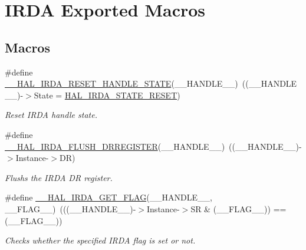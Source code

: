 \hypertarget{group___i_r_d_a___exported___macros}{}\section{I\+R\+DA Exported Macros}
\label{group___i_r_d_a___exported___macros}
\subsection*{Macros}
\begin{DoxyCompactItemize}
\item 
\#define \hyperlink{group___i_r_d_a___exported___macros_ga3cdb66f911dce4c8544139adbb314faa}{\+\_\+\+\_\+\+H\+A\+L\+\_\+\+I\+R\+D\+A\+\_\+\+R\+E\+S\+E\+T\+\_\+\+H\+A\+N\+D\+L\+E\+\_\+\+S\+T\+A\+TE}(\+\_\+\+\_\+\+H\+A\+N\+D\+L\+E\+\_\+\+\_\+)~((\+\_\+\+\_\+\+H\+A\+N\+D\+L\+E\+\_\+\+\_\+)-\/$>$State = \hyperlink{group___i_r_d_a___exported___types_ggab3e65b75c9d4ae39bc50a31222509e1eaa004e82e1ca1d36b3dc84cf9441954dd}{H\+A\+L\+\_\+\+I\+R\+D\+A\+\_\+\+S\+T\+A\+T\+E\+\_\+\+R\+E\+S\+ET})
\begin{DoxyCompactList}\small\item\em Reset I\+R\+DA handle state. \end{DoxyCompactList}\item 
\#define \hyperlink{group___i_r_d_a___exported___macros_ga0c097de13209ede853a30d511cf5a00e}{\+\_\+\+\_\+\+H\+A\+L\+\_\+\+I\+R\+D\+A\+\_\+\+F\+L\+U\+S\+H\+\_\+\+D\+R\+R\+E\+G\+I\+S\+T\+ER}(\+\_\+\+\_\+\+H\+A\+N\+D\+L\+E\+\_\+\+\_\+)~((\+\_\+\+\_\+\+H\+A\+N\+D\+L\+E\+\_\+\+\_\+)-\/$>$Instance-\/$>$DR)
\begin{DoxyCompactList}\small\item\em Flushs the I\+R\+DA DR register. \end{DoxyCompactList}\item 
\#define \hyperlink{group___i_r_d_a___exported___macros_ga032a53fbbc65bfd0fff2b4a26c52e790}{\+\_\+\+\_\+\+H\+A\+L\+\_\+\+I\+R\+D\+A\+\_\+\+G\+E\+T\+\_\+\+F\+L\+AG}(\+\_\+\+\_\+\+H\+A\+N\+D\+L\+E\+\_\+\+\_\+,  \+\_\+\+\_\+\+F\+L\+A\+G\+\_\+\+\_\+)~(((\+\_\+\+\_\+\+H\+A\+N\+D\+L\+E\+\_\+\+\_\+)-\/$>$Instance-\/$>$SR \& (\+\_\+\+\_\+\+F\+L\+A\+G\+\_\+\+\_\+)) == (\+\_\+\+\_\+\+F\+L\+A\+G\+\_\+\+\_\+))
\begin{DoxyCompactList}\small\item\em Checks whether the specified I\+R\+DA flag is set or not. \end{DoxyCompactList}\item 

\end{DoxyCompactItemize}
